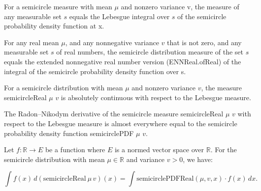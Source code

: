\begin{lemma}
    \label{lemma:semicircleReal_apply}
    \leanok
    For a semicircle measure with mean $\mu$ and nonzero variance v, the measure of any measurable set $s$ equals the Lebesgue integral over $s$ of the semicircle probability density function at x.
\end{lemma}

\begin{lemma}
    \label{lemma:semicircleReal_apply_eq_integral}
    \leanok
    For any real mean $\mu$, and any nonnegative variance $v$ that is not zero, and any measurable set $s$ of real numbers, the semicircle distribution measure of the set $s$ equals the extended nonnegative real number version (ENNReal.ofReal) of the integral of the semicircle probability density function over s.
\end{lemma}

\begin{lemma}
    \label{lemma:semicircleReal_absolutelyContinuous}
    \leanok
    For a semicircle distribution with mean $\mu$ and nonzero variance $v$, the measure semicircleReal $μ$ $v$ is absolutely continuous with respect to the Lebesgue measure.
\end{lemma}

\begin{lemma}
    \label{lemma:rnDeriv_semicircleReal}
    \leanok
    The Radon–Nikodym derivative of the semicircle measure semicircleReal $\mu$ $v$ with respect to the Lebesgue measure is almost everywhere equal to the semicircle probability density function semicirclePDF $\mu$ $v$.
\end{lemma}

\begin{lemma}
    \label{lemma:integral_semicircleReal_eq_integral_smul}
    \leanok

    Let $ f : \mathbb{R} \to E $ be a function where $ E $ is a normed vector space over $\mathbb{R}$. For the semicircle distribution with mean $\mu \in \mathbb{R}$ and variance $ v > 0 $, we have:

    \[
    \int f(x) \, d(\mathrm{semicircleReal}\ \mu\, v)(x) = \int \mathrm{semicirclePDFReal}(\mu, v, x) \cdot f(x) \, dx.
    \]
    
    
\end{lemma}

